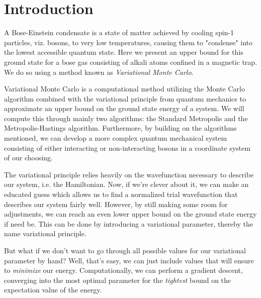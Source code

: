 \documentclass[
    a4paper, aps, twocolumn, floatfix, superscriptaddress,
    nofootinbib]{revtex4-1}
\begin{document}
\vfill


\newpage

\section{Introduction}
A Bose-Einstein condensate is a state of matter achieved by cooling spin-1 particles, viz. bosons, to very low temperatures, causing them to "condense" into the lowest accessible quantum state. Here we present an upper bound for this ground state for a bose gas consisting of alkali atoms confined in a magnetic trap. We do so using a method known as \textit{Variational Monte Carlo}.

Variational Monte Carlo is a computational method utilizing the Monte Carlo algorithm combined with the variational principle from quantum mechanics to approximate an upper bound on the ground state energy of a system. We will compute this through mainly two algorithms: the Standard Metropolis and the Metropolis-Hastings algorithm. Furthermore, by building on the algorithms mentioned, we can develop a more complex quantum mechanical system consisting of either interacting or non-interacting bosons in a coordinate system of our choosing.

The variational principle relies heavily on the wavefunction necessary to describe our system, i.e. the Hamiltonian. Now, if we're clever about it, we can make an educated guess which allows us to find a normalized trial wavefunction that describes our system fairly well. However, by still making some room for adjustments, we can reach an even lower upper bound on the ground state energy if need be. This can be done by introducing a variational parameter, thereby the name variational principle.

But what if we don't want to go through all possible values for our variational parameter by hand? Well, that's easy, we can just include values that will ensure to \textit{minimize} our energy. Computationally, we can perform a gradient descent, converging into the most optimal parameter for the \textit{tightest} bound on the expectation value of the energy.
\end{document}
